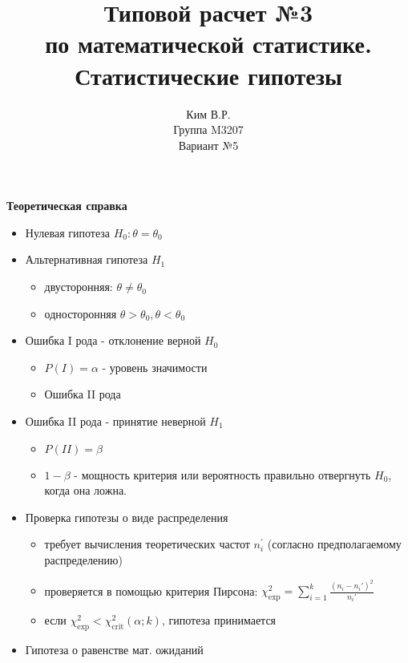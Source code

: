 \documentclass[a4paper,11pt]{article}
\title{Типовой расчет №3 \\ по математической статистике. \\ Статистические гипотезы}
\author{Ким В.Р. \\ Группа M3207 \\ Вариант №5}
\date{}
\newenvironment{shdd}{\begin{mdframed}[backgroundcolor=shadecolor]}{\end{mdframed}}
\theoremstyle{definition}
\begin{document}
    \maketitle

    \begin{shdd}
        \textbf{Теоретическая справка}\par\setlength{\parindent}{0pt}
        \begin{itemize}
            \item Нулевая гипотеза \(H_0 : \theta = \theta_0\)
            \item Альтернативная гипотеза \(H_1\)
            \begin{itemize}
                \item двусторонняя: \(\theta \neq \theta_0\)
                \item односторонняя \(\theta > \theta_0, \theta < \theta_0\)
            \end{itemize}
            \item Ошибка I рода - отклонение верной \(H_0\)
            \begin{itemize}
                \item \(P(I) = \alpha\) - уровень значимости
                \item Ошибка II рода
            \end{itemize}
            \item Ошибка II рода - принятие неверной \(H_1\)
            \begin{itemize}
                \item \(P(II) = \beta\)
                \item \(1 - \beta\) - мощность критерия
                или вероятность правильно отвергнуть \(H_0\), когда она ложна.
            \end{itemize}
            \item Проверка гипотезы о виде распределения
            \begin{itemize}
                \item требует вычисления теоретических частот \(n_i^{'}\) (согласно предполагаемому распределению)
                \item проверяется в помощью критерия Пирсона: \(\chi^2_{\text{exp}} = \sum_{i=1}^k \frac{(n_i - n_i')^2}{n_i'}\)
                \item если \(\chi^2_{\text{exp}} < \chi^2_{\text{crit}}(\alpha; k) \), гипотеза принимается
            \end{itemize}
            \item Гипотеза о равенстве мат. ожиданий

\end{itemize}
\end{shdd}
\end{document}
